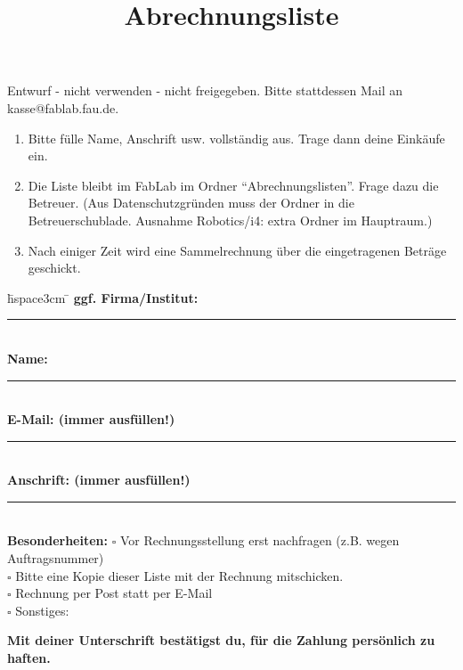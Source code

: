 \documentclass{\basedir fablab-document}
\date{}
\author{}
\title{Abrechnungsliste}
\begin{document}
	\vspace*{-5em}
	
	
	
    \vspace{10em}
	{\LARGE Entwurf - nicht verwenden - nicht freigegeben. Bitte stattdessen Mail an kasse@fablab.fau.de.}
    \vspace{10em}
	
	
\begin{enumerate}
	\item Bitte fülle Name, Anschrift usw. vollständig aus. Trage dann deine Einkäufe ein.
	\item Die Liste bleibt im FabLab im Ordner \enquote{Abrechnungslisten}. Frage dazu die Betreuer. {\small (Aus Datenschutzgründen muss der Ordner in die Betreuerschublade. Ausnahme Robotics/i4: extra Ordner im Hauptraum.) }
	\item Nach einiger Zeit wird eine Sammelrechnung über die eingetragenen Beträge geschickt.
\end{enumerate} 


\newcommand{\breite}{12.5cm}

\begin{tabbing}
\hspace{5cm} \= hspace{3cm}  \= \kill
\textbf{ggf. Firma/Institut: }\> \rule{\breite}{0.4pt}\\[2ex]
\textbf{Name:} \> \rule{\breite}{0.4pt}\\[2ex]
\textbf{E-Mail: {\small (immer ausfüllen!)}}\> \rule{\breite}{0.4pt} \\[3ex]
\textbf{Anschrift: {\small (immer ausfüllen!)} } \> \rule{\breite}{0.4pt} \\[2ex]
\textbf{Besonderheiten: }\> $\square$ Vor Rechnungsstellung erst nachfragen (z.B. wegen Auftragsnummer)\\
\> $\square$ Bitte eine Kopie dieser Liste mit der Rechnung mitschicken.\\
\> $\square$ Rechnung per Post statt per E-Mail\\
\> $\square$ Sonstiges:
\end{tabbing}

\textbf{\large Mit deiner Unterschrift bestätigst du, für die Zahlung persönlich zu haften.}
\end{document}
